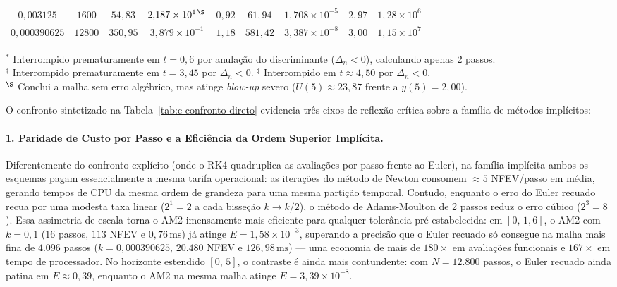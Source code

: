 \documentclass[12pt, a4paper]{article}
\begin{document}
\begin{table}[H]
{\begin{tabular}{ccccccccc}
$0{,}003125$    & $1600$  & $54{,}83$ & $2{,}187 \times 10^{1\,\S}$ & $0{,}92$  & $61{,}94$ & $1{,}708 \times 10^{-5}$  & $2{,}97$ & $1{,}28 \times 10^{6}$ \\
$0{,}000390625$ & $12800$ & $350{,}95$& $3{,}879 \times 10^{-1}$    & $1{,}18$  & $581{,}42$& $3{,}387 \times 10^{-8}$  & $3{,}00$ & $1{,}15 \times 10^{7}$ \\
\bottomrule
\end{tabular}%
}
\vspace{1mm}
\parbox{\textwidth}{\footnotesize
$^*$ Interrompido prematuramente em $t = 0{,}6$ por anulação do discriminante ($\Delta_n < 0$), calculando apenas 2 passos.\\
$^\dagger$ Interrompido prematuramente em $t = 3{,}45$ por $\Delta_n < 0$. \quad
$^\ddagger$ Interrompido em $t \approx 4{,}50$ por $\Delta_n < 0$.\\
$^\S$ Conclui a malha sem erro algébrico, mas atinge \emph{blow-up} severo ($U(5) \approx 23{,}87$ frente a $y(5) = 2{,}00$).
}
\end{table}

O confronto sintetizado na Tabela~\ref{tab:c-confronto-direto} evidencia três eixos de reflexão crítica sobre a família de métodos implícitos:

\paragraph{1. Paridade de Custo por Passo e a Eficiência da Ordem Superior Implícita.}
Diferentemente do confronto explícito (onde o RK4 quadruplica as avaliações por passo frente ao Euler), na família implícita ambos os esquemas pagam essencialmente a mesma tarifa operacional: as iterações do método de Newton consomem $\approx 5$ NFEV/passo em média, gerando tempos de CPU da mesma ordem de grandeza para uma mesma partição temporal. Contudo, enquanto o erro do Euler recuado recua por uma modesta taxa linear ($2^1 = 2$ a cada bisseção $k \to k/2$), o método de Adams-Moulton de 2 passos reduz o erro cúbico ($2^3 = 8$). Essa assimetria de escala torna o AM2 imensamente mais eficiente para qualquer tolerância pré-estabelecida: em $[0,\, 1{,}6]$, o AM2 com $k = 0{,}1$ ($16$ passos, $113$ NFEV e $0{,}76\,\text{ms}$) já atinge $E = 1{,}58 \times 10^{-3}$, superando a precisão que o Euler recuado só consegue na malha mais fina de $4.096$ passos ($k = 0{,}000390625$, $20.480$ NFEV e $126{,}98\,\text{ms}$) — uma economia de mais de $180\times$ em avaliações funcionais e $167\times$ em tempo de processador. No horizonte estendido $[0,\, 5]$, o contraste é ainda mais contundente: com $N = 12.800$ passos, o Euler recuado ainda patina em $E \approx 0{,}39$, enquanto o AM2 na mesma malha atinge $E = 3{,}39 \times 10^{-8}$.
\end{document}
